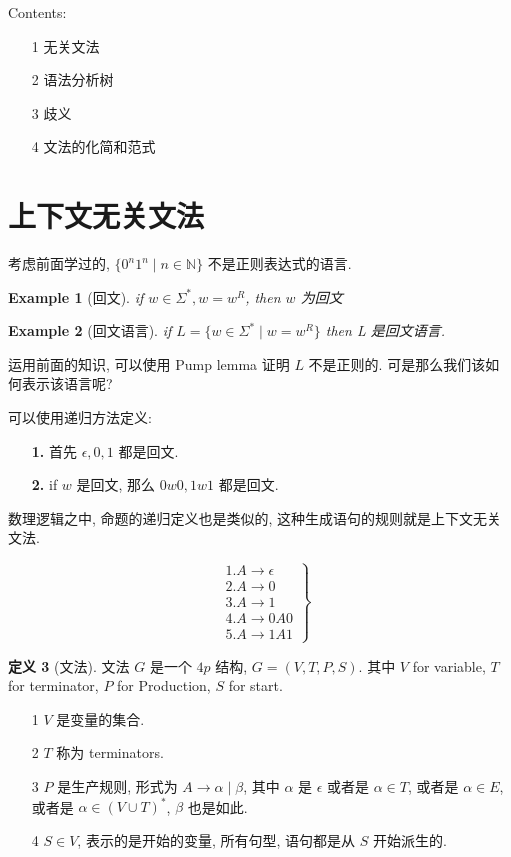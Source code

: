 \documentclass[12pt]{ctexart}
\theoremstyle{definition}
\theoremstyle{definition}
\newtheorem{definition}{定义}[section]
\theoremstyle{plain}
\newtheorem{exam}[definition]{Example}
\theoremstyle{remark}
\begin{document}
\tableofcontents
Contents: 
\begin{itemize}
\item [1] 无关文法 
\item [2] 语法分析树
\item [3]  歧义
\item [4] 文法的化简和范式
\end{itemize}

\section{上下文无关文法}\label{sec:def}
考虑前面学过的, \(\{  0 ^{n} 1 ^{n} \mid n \in \mathbb{N}\}\) 不是正则表达式的语言. 



\begin{exam}[回文]
if \(w \in \Sigma ^{*} , w = w ^{R}\), then \(w\) 为回文
\end{exam}

\begin{exam}[回文语言]
	if \( L =  \{ w \in \Sigma ^{* } \mid w = w ^{R} \}\)
	then L 是回文语言. 
\end{exam}
运用前面的知识, 可以使用 Pump lemma 证明 \(L\) 不是正则的. 可是那么我们该如何表示该语言呢? 

可以使用递归方法定义: 
\begin{itemize}
\item [\textbf{1.}] 首先 \(\epsilon, 0 , 1\) 都是回文.
\item [\textbf{2.}] if \(w\) 是回文, 那么 \( 0  w 0 , 1 w 1 \) 都是回文. 
\end{itemize}
数理逻辑之中, 命题的递归定义也是类似的, 这种生成语句的规则就是上下文无关文法. 




\begin{equation}
\left.
\begin{aligned}
&1. A \to\epsilon \\ 
&2. A \to 0 \\ 
&3. A \to 1 \\ 
&4. A \to 0 A 0 \\ 
&5. A \to 1A1
\end{aligned}
\right\}
\end{equation}

\begin{definition}[文法]
	文法 \(G\) 是一个 \(4p\) 结构, \(G = (V , T , P , S ) \).
	其中 \(V \) for variable, \(T\) for terminator, \(P\) for Production, \(S\) for start.
	\begin{itemize}
	\item [1]  \(V\) 是变量的集合. 
	\item [2]  \(T\) 称为 terminators. 
	\item [3]  \(P\) 是生产规则, 形式为 \(A \to\alpha \mid\beta\), 其中 \(\alpha\) 是 \( \epsilon \) 或者是 \(\alpha \in T \), 或者是 \(\alpha \in E \), 或者是 \(\alpha \in (V\cup T )^{*} \), \(\beta \) 也是如此. 
	\item [4]  \( S \in V\), 表示的是开始的变量, 所有句型, 语句都是从 \( S\) 开始派生的. 
	\end{itemize}
\end{definition}
\end{document}
